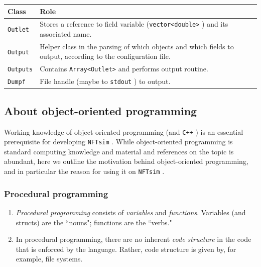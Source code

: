 \documentclass[12pt,a4paper]{article}
\newcommand{\type}[1]{{\small\small\tt #1} }
\newcommand{\NF}[0]{\type{NFTsim}}
\begin{document}
\begin{tabular}{l p{16cm}}
    Class&Role\\
    \hline
    \type{Outlet}&Stores a reference to field variable (\type{vector<double>}) and its associated name.\\
    \type{Output}&Helper class in the parsing of which objects and which fields to output, according to the configuration file.\\
    \type{Outputs}&Contains \type{Array<Outlet>} and performs output routine.\\
    \type{Dumpf}&File handle (maybe to \type{stdout}) to output.
\end{tabular}



\subsection{About object-oriented programming}

Working knowledge of object-oriented programming (and \type{C++}) is an essential prerequisite for developing \NF. While object-oriented programming is standard computing knowledge and material and references on the topic is abundant, here we outline the motivation behind object-oriented programming, and in particular the reason for using it on \NF.

\subsubsection{Procedural programming}

\begin{enumerate}

\item \emph{Procedural programming} consists of \emph{variables} and \emph{functions}. Variables (and structs) are the ``nouns"; functions are the ``verbs."

\item In procedural programming, there are no inherent \emph{code structure} in the code that is enforced by the language. Rather, code structure is given by, for example, file systems.
\end{enumerate}
\end{document}
